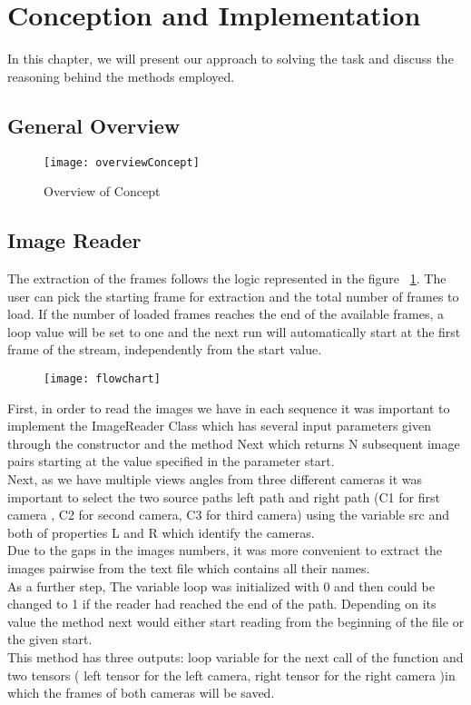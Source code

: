 \section{Conception and Implementation}
\label{Conception and Implementation}

In this chapter, we will present our approach to solving the task and discuss the reasoning behind the methods employed.
\subsection{General Overview}
\begin{figure}[h]
		\texttt{[image: overviewConcept]}
		\caption{Overview of Concept}
\end{figure}


\subsection{Image Reader}

The extraction of the frames follows the logic represented in the figure ~\ref{fig:flowchart}. The user can pick the starting frame for extraction and the total number of frames to load. If the number of loaded frames reaches the end of the available frames, a loop value will be set to one and the next run will automatically start at the first frame of the stream, independently from the start value.
\begin{figure}[!h]
	\centering
	\texttt{[image: flowchart]}
	\label{fig:flowchart}
\end{figure}
\newpage
First, in order to read the images we have in each sequence it was important to implement the ImageReader Class which has several input parameters given through the constructor and the method Next which returns N subsequent image pairs starting at the value specified in the parameter start.
\\
Next, as we have multiple views angles from three different cameras it was important to select the two source paths left path and right path (C1 for first camera , C2 for second camera, C3 for third camera) using the variable src and both of properties L and R which identify the cameras. 
\\
Due to the gaps in the images numbers, it was more convenient to extract the images pairwise from the text file which contains all their names. 
\\
As a further step, The variable loop was initialized with 0 and then could be changed to 1 if the reader had reached the end of the path. Depending on its value the method next would either start reading from the beginning of the file or the given start.
\\
This method has three outputs: loop variable for the next call of the function and two tensors ( left tensor for the left camera, right tensor for the right camera )in which the frames of both cameras will be saved.
